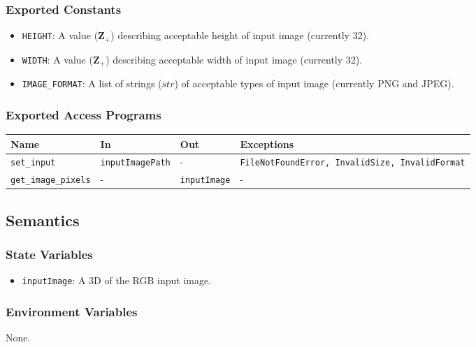 \documentclass[12pt, titlepage]{article}
\def\code#1{\texttt{#1}}
\begin{document}
\subsubsection{Exported Constants}
\begin{itemize}
  \item \code{HEIGHT}: A value ($\mathbf{Z}_{+}$) describing acceptable height of input image 
  (currently 32).
  \item \code{WIDTH}: A value ($\mathbf{Z}_{+}$) describing acceptable width of input image
  (currently 32).
  \item \code{IMAGE\_FORMAT}: A list of strings ($str$) of acceptable types of input image 
  (currently PNG and JPEG).
\end{itemize}

\subsubsection{Exported Access Programs}

\begin{center}
\begin{tabular}{p{3.5cm} p{4cm} p{4cm} p{4cm}}
\hline
\textbf{Name} & \textbf{In} & \textbf{Out} & \textbf{Exceptions} \\
\hline
\code{set\_input} & \code{inputImagePath} & - & \code{FileNotFoundError, InvalidSize, InvalidFormat} \\
\code{get\_image\_pixels} & - & \code{inputImage} & - \\
\hline
\end{tabular}
\end{center}

\subsection{Semantics}

\subsubsection{State Variables}
\begin{itemize}
  \item \code{inputImage}: A 3D of the RGB input image.
\end{itemize}

\subsubsection{Environment Variables}
None.
\end{document}
